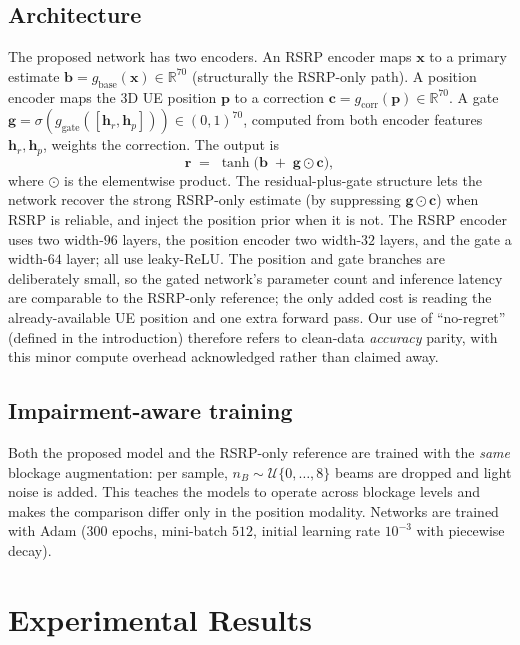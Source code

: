 \documentclass[conference]{IEEEtran}
\begin{document}
\subsection{Architecture}
The proposed network has two encoders. An RSRP encoder maps $\mathbf{x}$ to a
primary estimate $\mathbf{b}=g_{\text{base}}(\mathbf{x})\in\mathbb{R}^{70}$
(structurally the RSRP-only path). A position encoder maps the 3D UE position
$\mathbf{p}$ to a correction $\mathbf{c}=g_{\text{corr}}(\mathbf{p})\in
\mathbb{R}^{70}$. A gate $\mathbf{g}=\sigma(g_{\text{gate}}([\mathbf{h}_r,
\mathbf{h}_p]))\in(0,1)^{70}$, computed from both encoder features
$\mathbf{h}_r,\mathbf{h}_p$, weights the correction. The output is
\begin{equation}
\hat{\mathbf{r}} \;=\; \tanh\!\big(\mathbf{b} \;+\; \mathbf{g}\odot\mathbf{c}\big),
\label{eq:gated}
\end{equation}
where $\odot$ is the elementwise product. The residual-plus-gate structure lets
the network recover the strong RSRP-only estimate (by suppressing
$\mathbf{g}\odot\mathbf{c}$) when RSRP is reliable, and inject the position prior
when it is not. The RSRP encoder uses two width-$96$ layers, the position encoder
two width-$32$ layers, and the gate a width-$64$ layer; all use leaky-ReLU. The
position and gate branches are deliberately small, so the gated network's
parameter count and inference latency are comparable to the RSRP-only reference;
the only added cost is reading the already-available UE position and one extra
forward pass. Our use of ``no-regret'' (defined in
the introduction) therefore refers to clean-data \emph{accuracy} parity, with this
minor compute overhead acknowledged rather than claimed away.

\subsection{Impairment-aware training}
Both the proposed model and the RSRP-only reference are trained with the
\emph{same} blockage augmentation: per sample, $n_B\sim\mathcal{U}\{0,\dots,8\}$
beams are dropped and light noise is added. This teaches the models to operate
across blockage levels and makes the comparison differ only in the position
modality. Networks are trained with Adam ($300$ epochs, mini-batch $512$, initial
learning rate $10^{-3}$ with piecewise decay).

\section{Experimental Results}\label{sec:results}
\end{document}
